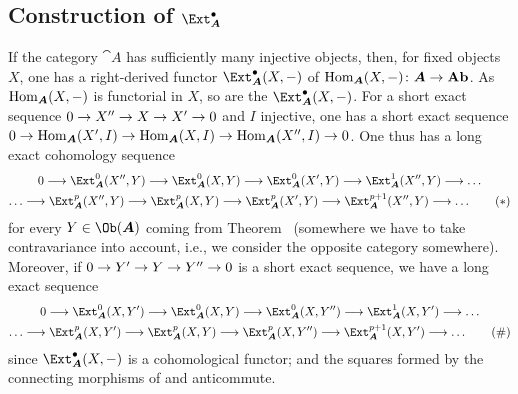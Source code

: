 \documentclass[a4paper,parskip=half,numbers=enddot, DIV=12]{scrreprt}
\begin{document}
\subsection{Construction of \texorpdfstring{$\Ext_{\boldsymbol A}^\bullet$}{Ext}}
If the category ${\cat A}$ has sufficiently many injective objects, then, for fixed objects $X$, one has a right-derived functor $\Ext_{\cat A}^\bullet(X,-)$ of $\Hom_{\cat A}(X,-)\colon {\cat A}\morphism\cat{Ab}$. As $\Hom_{\cat A}(X,-)$ is functorial in $X$, so are the $\Ext_{\cat A}^\bullet(X,-)$. For a short exact sequence $0\morphism X''\morphism X\morphism X'\morphism 0$ and $I$ injective, one has a short exact sequence $0\morphism\Hom_{\cat A}(X',I)\morphism\Hom_{\cat A}(X,I)\morphism\Hom_{\cat A}(X'',I)\morphism 0$. One thus has a long exact cohomology sequence
\begin{multline}\lbl{eq:ExtSeq1}
	0\morphism\Ext_{\cat A}^0(X'',Y)\morphism\Ext_{\cat A}^0(X,Y)\morphism\Ext_{\cat A}^0(X',Y)\morphism\Ext_{\cat A}^1(X'',Y)\morphism\ldots\\
	\ldots\morphism\Ext_{\cat A}^p(X'',Y)\morphism\Ext_{\cat A}^p(X,Y)\morphism\Ext_{\cat A}^p(X',Y)\morphism\Ext_{\cat A}^{p+1}(X'',Y)\morphism\ldots\tag{$*$}
\end{multline}
for every $Y\in\Ob({\cat A})$ coming from Theorem~ (somewhere we have to take contravariance into account, i.e., we consider the opposite category somewhere). Moreover, if $0\morphism Y'\morphism Y\morphism Y''\morphism 0$ is  a short exact sequence, we have a long exact sequence
\begin{multline}\lbl{eq:ExtSeq2}
0\morphism\Ext_{\cat A}^0(X,Y')\morphism\Ext_{\cat A}^0(X,Y)\morphism\Ext_{\cat A}^0(X,Y'')\morphism\Ext_{\cat A}^1(X,Y')\morphism\ldots\\
\ldots\morphism\Ext_{\cat A}^p(X,Y')\morphism\Ext_{\cat A}^p(X,Y)\morphism\Ext_{\cat A}^p(X,Y'')\morphism\Ext_{\cat A}^{p+1}(X,Y')\morphism\ldots\tag{\#}
\end{multline}
since $\Ext_{\cat A}^\bullet(X,-)$ is a cohomological functor; and the squares formed by the connecting morphisms of   and  anticommute.
\end{document}

